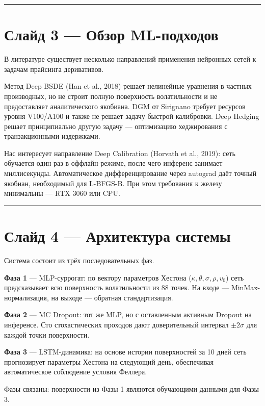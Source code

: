 \documentclass[12pt,a4paper]{article}
\begin{document}
\vspace{1em}\hrule\vspace{1em}

\section*{Слайд 3 — Обзор ML-подходов}

В литературе существует несколько направлений применения нейронных сетей к задачам прайсинга деривативов.

Метод Deep BSDE (Han et al., 2018) решает нелинейные уравнения в частных производных, но не строит полную поверхность волатильности и не предоставляет аналитического якобиана. DGM от Sirignano требует ресурсов уровня V100/A100 и также не решает задачу быстрой калибровки. Deep Hedging решает принципиально другую задачу — оптимизацию хеджирования с транзакционными издержками.

Нас интересует направление Deep Calibration (Horvath et al., 2019): сеть обучается один раз в оффлайн-режиме, после чего инференс занимает миллисекунды. Автоматическое дифференцирование через autograd даёт точный якобиан, необходимый для L-BFGS-B. При этом требования к железу минимальны — RTX 3060 или CPU.

\vspace{1em}\hrule\vspace{1em}

\section*{Слайд 4 — Архитектура системы}

Система состоит из трёх последовательных фаз.

\textbf{Фаза 1} — MLP-суррогат: по вектору параметров Хестона ($\kappa, \theta, \sigma, \rho, v_0$) сеть предсказывает всю поверхность волатильности из 88 точек. На входе — MinMax-нормализация, на выходе — обратная стандартизация.

\textbf{Фаза 2} — MC Dropout: тот же MLP, но с оставленным активным Dropout на инференсе. Сто стохастических проходов дают доверительный интервал $\pm 2\sigma$ для каждой точки поверхности.

\textbf{Фаза 3} — LSTM-динамика: на основе истории поверхностей за 10 дней сеть прогнозирует параметры Хестона на следующий день, обеспечивая автоматическое соблюдение условия Феллера.

Фазы связаны: поверхности из Фазы 1 являются обучающими данными для Фазы 3.
\end{document}
